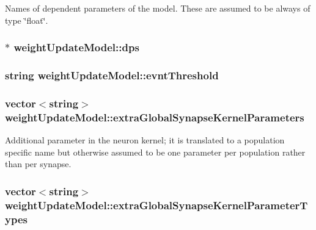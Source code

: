 Names of dependent parameters of the model. These are assumed to be always of type \char`\"{}float\char`\"{}. 

\hypertarget{classweightUpdateModel_a7f23e71d08ca83e3f5941105b90814d5}{
\subsubsection[{dps}]{$\ast$ weight\+Update\+Model\+::dps}}\label{classweightUpdateModel_a7f23e71d08ca83e3f5941105b90814d5}
\hypertarget{classweightUpdateModel_acccf120c9b1307f7ee2c5bac43110be1}{
\subsubsection[{evnt\+Threshold}]{\setlength{\rightskip}{0pt plus 5cm}string weight\+Update\+Model\+::evnt\+Threshold}}\label{classweightUpdateModel_acccf120c9b1307f7ee2c5bac43110be1}
\hypertarget{classweightUpdateModel_aeab0e4003100c943d2ddcd3481f5f660}{
\subsubsection[{extra\+Global\+Synapse\+Kernel\+Parameters}]{\setlength{\rightskip}{0pt plus 5cm}vector$<$string$>$ weight\+Update\+Model\+::extra\+Global\+Synapse\+Kernel\+Parameters}}\label{classweightUpdateModel_aeab0e4003100c943d2ddcd3481f5f660}


Additional parameter in the neuron kernel; it is translated to a population specific name but otherwise assumed to be one parameter per population rather than per synapse. 

\hypertarget{classweightUpdateModel_a3e8b0003232bcbdf1be31425d87eb233}{
\subsubsection[{extra\+Global\+Synapse\+Kernel\+Parameter\+Types}]{\setlength{\rightskip}{0pt plus 5cm}vector$<$string$>$ weight\+Update\+Model\+::extra\+Global\+Synapse\+Kernel\+Parameter\+Types}}\label{classweightUpdateModel_a3e8b0003232bcbdf1be31425d87eb233}


